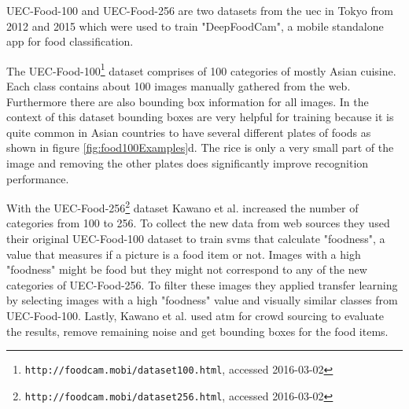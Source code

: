 UEC-Food-100 \cite{Matsuda2012} and UEC-Food-256 \cite{Kawano2015} are two datasets from the \gls{uec} in Tokyo from 2012 and 2015 which were used to train "DeepFoodCam", a mobile standalone app for food classification.

The UEC-Food-100\footnote{\texttt{http://foodcam.mobi/dataset100.html}, accessed 2016-03-02} dataset comprises of 100 categories of mostly Asian cuisine. Each class contains about 100 images manually gathered from the web. Furthermore there are also bounding box information for all images. In the context of this dataset bounding boxes are very helpful for training because it is quite common in Asian countries to have several different plates of foods as shown in figure \ref{fig:food100Examples}d. The rice is only a very small part of the image and removing the other plates does significantly improve recognition performance.

With the UEC-Food-256\footnote{\texttt{http://foodcam.mobi/dataset256.html}, accessed 2016-03-02} dataset Kawano et al. increased the number of categories from 100 to 256. To collect the new data from web sources they used their original UEC-Food-100 dataset to train \glspl{svm} that calculate "foodness", a value that measures if a picture is a food item or not. Images with a high "foodness" might be food but they might not correspond to any of the new categories of  UEC-Food-256. To filter these images they applied transfer learning by selecting images with a high "foodness" value and visually similar classes from UEC-Food-100. Lastly, Kawano et al. used \gls{atm} for crowd sourcing to evaluate the results, remove remaining noise and get bounding boxes for the food items. 

